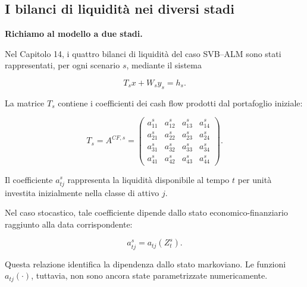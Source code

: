 


\subsection{I bilanci di liquidit\`a nei diversi stadi}

\medskip

\noindent
\textbf{Richiamo al modello a due stadi.}

Nel Capitolo 14, i quattro bilanci di liquidit\`a
del caso SVB--ALM sono stati rappresentati,
per ogni scenario $s$, mediante il sistema

\[
T_sx+W_sy_s=h_s.
\]

La matrice $T_s$ contiene i coefficienti
dei cash flow prodotti dal portafoglio iniziale:

\[
T_s=A^{CF,s}
=
\begin{pmatrix}
a_{11}^s&a_{12}^s&a_{13}^s&a_{14}^s\\
a_{21}^s&a_{22}^s&a_{23}^s&a_{24}^s\\
a_{31}^s&a_{32}^s&a_{33}^s&a_{34}^s\\
a_{41}^s&a_{42}^s&a_{43}^s&a_{44}^s
\end{pmatrix}.
\]

Il coefficiente $a_{tj}^s$ rappresenta la liquidit\`a
disponibile al tempo $t$ per unit\`a investita
inizialmente nella classe di attivo $j$.

Nel caso stocastico, tale coefficiente dipende
dallo stato economico-finanziario raggiunto
alla data corrispondente:

\[
a_{tj}^s=a_{tj}(Z_t^s).
\]

Questa relazione identifica la dipendenza
dallo stato markoviano. Le funzioni
$a_{tj}(\cdot)$, tuttavia, non sono
ancora state parametrizzate numericamente.

